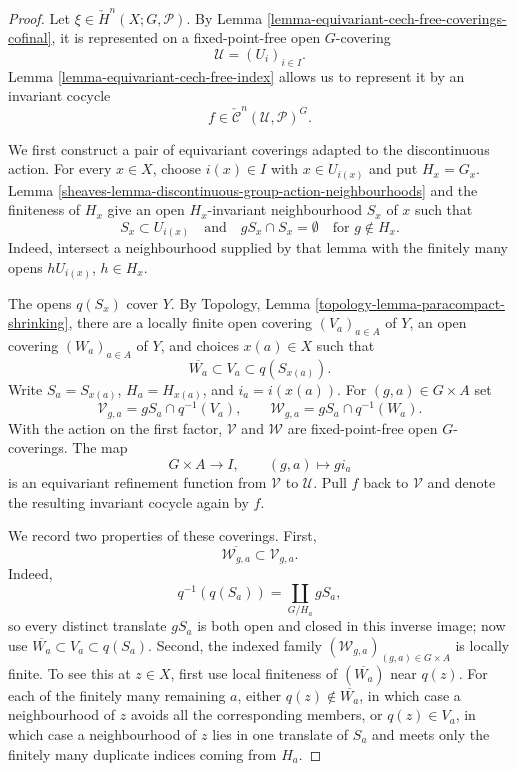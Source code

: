 \begin{proof}
Let $\xi\in\check H^n(X;G,\mathcal P)$. By Lemma
\ref{lemma-equivariant-cech-free-coverings-cofinal}, it is represented on
a fixed-point-free open $G$-covering
$$
\mathcal U=(U_i)_{i\in I}.
$$
Lemma \ref{lemma-equivariant-cech-free-index} allows us to represent it by
an invariant cocycle
$$
f\in\check{\mathcal C}^n(\mathcal U,\mathcal P)^G.
$$

We first construct a pair of equivariant coverings adapted to the
discontinuous action. For every $x\in X$, choose $i(x)\in I$ with
$x\in U_{i(x)}$ and put $H_x=G_x$. Lemma
\ref{sheaves-lemma-discontinuous-group-action-neighbourhoods} and the
finiteness of $H_x$ give an open $H_x$-invariant neighbourhood $S_x$ of
$x$ such that
$$
S_x\subset U_{i(x)}
\quad\text{and}\quad
gS_x\cap S_x=\emptyset\quad\text{for }g\notin H_x.
$$
Indeed, intersect a neighbourhood supplied by that lemma with the finitely
many opens $hU_{i(x)}$, $h\in H_x$.

The opens $q(S_x)$ cover $Y$. By Topology, Lemma
\ref{topology-lemma-paracompact-shrinking}, there are a locally finite
open covering $(V_a)_{a\in A}$ of $Y$, an open covering
$(W_a)_{a\in A}$ of $Y$, and choices $x(a)\in X$ such that
$$
\overline{W_a}\subset V_a\subset q(S_{x(a)}).
$$
Write $S_a=S_{x(a)}$, $H_a=H_{x(a)}$, and $i_a=i(x(a))$. For
$(g,a)\in G\times A$ set
$$
\mathcal V_{g,a}=gS_a\cap q^{-1}(V_a),
\qquad
\mathcal W_{g,a}=gS_a\cap q^{-1}(W_a).
$$
With the action on the first factor, $\mathcal V$ and $\mathcal W$ are
fixed-point-free open $G$-coverings. The map
$$
G\times A\longrightarrow I,
\qquad (g,a)\longmapsto gi_a
$$
is an equivariant refinement function from $\mathcal V$ to $\mathcal U$.
Pull $f$ back to $\mathcal V$ and denote the resulting invariant cocycle
again by $f$.

We record two properties of these coverings. First,
$$
\overline{\mathcal W_{g,a}}\subset\mathcal V_{g,a}.
$$
Indeed,
$$
q^{-1}(q(S_a))=\coprod_{G/H_a}gS_a,
$$
so every distinct translate $gS_a$ is both open and closed in this inverse
image; now use $\overline{W_a}\subset V_a\subset q(S_a)$. Second, the
indexed family $(\mathcal W_{g,a})_{(g,a)\in G\times A}$ is locally finite.
To see this at $z\in X$, first use local finiteness of
$(\overline{W_a})$ near $q(z)$. For each of the finitely many remaining
$a$, either $q(z)\notin\overline{W_a}$, in which case a neighbourhood of
$z$ avoids all the corresponding members, or $q(z)\in V_a$, in which
case a neighbourhood of $z$ lies in one translate of $S_a$ and meets only
the finitely many duplicate indices coming from $H_a$.


\end{proof}
